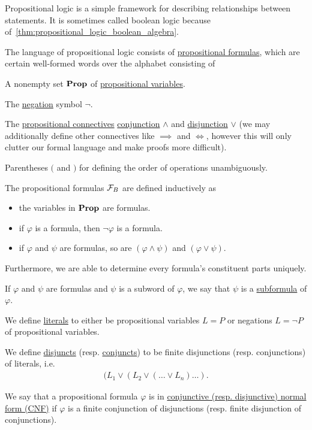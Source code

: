 Propositional logic is a simple framework for describing relationships between statements. It is sometimes called boolean logic because of~\cref{thm:propositional_logic_boolean_algebra}.

\begin{definition}\label{def:propositional_logic_language}\cite[3]{Lectures:logic_programming}
  The language of propositional logic consists of \uline{propositional formulas}, which are certain well-formed words over the alphabet consisting of
  \begin{defenum}
    \item\label{def:propositional_logic_language/prop} A nonempty set $\operatorname{\mathbf{Prop}}$ of \uline{propositional variables}.
    \item\label{def:propositional_logic_language/negation} The \uline{negation} symbol $\neg$.
    \item\label{def:propositional_logic_language/connectives} The \uline{propositional connectives} \uline{conjunction} $\land$ and \uline{disjunction} $\lor$ (we may additionally define other connectives like $\implies$ and $\iff$, however this will only clutter our formal language and make proofs more difficult).
    \item\label{def:propositional_logic_language/parentheses} Parentheses $($ and $)$ for defining the order of operations unambiguously.
  \end{defenum}

  The propositional formulas $\mathcal F_B$ are defined inductively as
  \begin{itemize}
    \item the variables in $\operatorname{\mathbf{Prop}}$ are formulas.
    \item if $\varphi$ is a formula, then $\neg \varphi$ is a formula.
    \item if $\varphi$ and $\psi$ are formulas, so are $(\varphi \land \psi)$ and $(\varphi \lor \psi)$.
  \end{itemize}

  Furthermore, we are able to determine every formula's constituent parts uniquely.

  If $\varphi$ and $\psi$ are formulas and $\psi$ is a subword of $\varphi$, we say that $\psi$ is a \uline{subformula} of $\varphi$.
\end{definition}

\begin{definition}\label{def:conjunctive_normal_form}
  We define \uline{literals} to either be propositional variables $L = P$ or negations $L = \neg P$ of propositional variables.

  We define \uline{disjuncts} (resp. \uline{conjuncts}) to be finite disjunctions (resp. conjunctions) of literals, i.e.
  \begin{align*}
    (L_1 \lor (L_2 \lor (\ldots \lor L_n) \ldots ).
  \end{align*}

  We say that a propositional formula $\varphi$ is in \uline{conjunctive (resp. disjunctive) normal form (CNF)} if $\varphi$ is a finite conjunction of disjunctions (resp. finite disjunction of conjunctions).
\end{definition}

